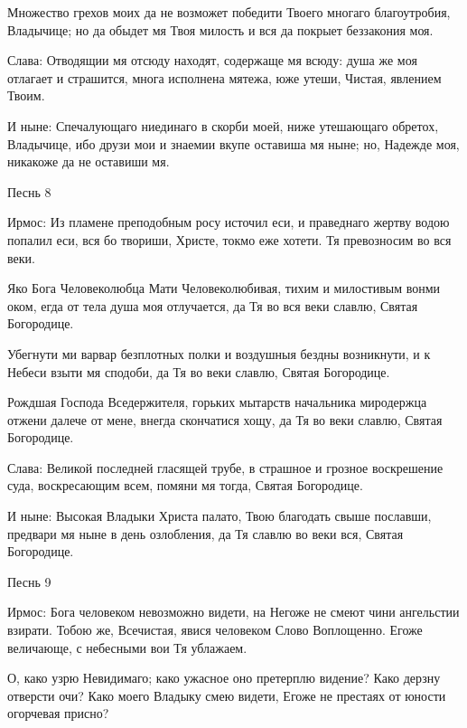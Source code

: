 Множество грехов моих да не возможет победити Твоего многаго благоутробия, Владычице; но да обыдет мя Твоя милость и вся да покрыет беззакония моя.


Слава: Отводящии мя отсюду находят, содержаще мя всюду: душа же моя отлагает и страшится, многа исполнена мятежа, юже утеши, Чистая, явлением Твоим.


И ныне: Спечалующаго ниединаго в скорби моей, ниже утешающаго обретох, Владычице, ибо друзи мои и знаемии вкупе оставиша мя ныне; но, Надежде моя, никакоже да не оставиши мя.


\bfseries \itshape 


Песнь 8\normalfont{}\normalfont{}


Ирмос: Из пламене преподобным росу источил еси, и праведнаго жертву водою попалил еси, вся бо твориши, Христе, токмо еже хотети. Тя превозносим во вся веки.





Яко Бога Человеколюбца Мати Человеколюбивая, тихим и милостивым вонми оком, егда от тела душа моя отлучается, да Тя во вся веки славлю, Святая Богородице.


Убегнути ми варвар безплотных полки и воздушныя бездны возникнути, и к Небеси взыти мя сподоби, да Тя во веки славлю, Святая Богородице.


Рождшая Господа Вседержителя, горьких мытарств начальника миродержца отжени далече от мене, внегда скончатися хощу, да Тя во веки славлю, Святая Богородице.


Слава: Великой последней гласящей трубе, в страшное и грозное воскрешение суда, воскресающим всем, помяни мя тогда, Святая Богородице.


И ныне: Высокая Владыки Христа палато, Твою благодать свыше пославши, предвари мя ныне в день озлобления, да Тя славлю во веки вся, Святая Богородице.


\bfseries \itshape 


Песнь 9\normalfont{}\normalfont{}


Ирмос: Бога человеком невозможно видети, на Негоже не смеют чини ангельстии взирати. Тобою же, Всечистая, явися человеком Слово Воплощенно. Егоже величающе, с небесными вои Тя ублажаем.





О, како узрю Невидимаго; како ужасное оно претерплю видение? Како дерзну отверсти очи? Како моего Владыку смею видети, Егоже не престаях от юности огорчевая присно?


